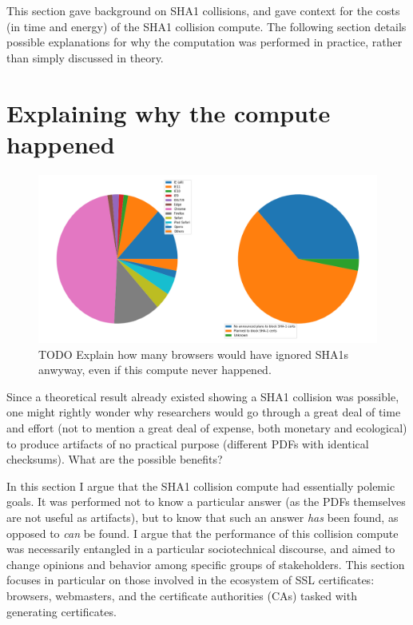 \documentclass[sigconf]{acmart}
\begin{document}
This section gave background on SHA1 collisions, 
and gave context for the costs (in time and energy) of the SHA1 collision compute.
The following section details possible explanations for why the computation was performed
in practice, rather than simply discussed in theory.


\section{Explaining why the compute happened}
\label{sec:org10a9967}

\begin{figure}
\centering
\includegraphics[width=.9\linewidth]{./figures/browser-share.png}
\caption{TODO Explain how many browsers would have ignored SHA1s anwyway, even if this compute never happened.}
\end{figure}

Since a theoretical result already existed showing a SHA1 collision was possible, 
one might rightly wonder why researchers would go through a great deal of time and effort
(not to mention a great deal of expense, both monetary and ecological)
to produce artifacts of no practical purpose (different PDFs with identical checksums).
What are the possible benefits?

In this section I argue that
the SHA1 collision compute had essentially polemic goals.
It was performed not to know a particular answer
(as the PDFs themselves are not useful as artifacts), 
but to know that such an answer \emph{has} been found,
as opposed to \emph{can} be found.
I argue that the performance of this collision compute
was necessarily entangled in a particular sociotechnical discourse,
and aimed to change opinions and behavior among specific groups of stakeholders.
This section focuses in particular on those involved in the ecosystem of SSL certificates: browsers, webmasters, and the certificate authorities (CAs) tasked with generating certificates.
\end{document}
